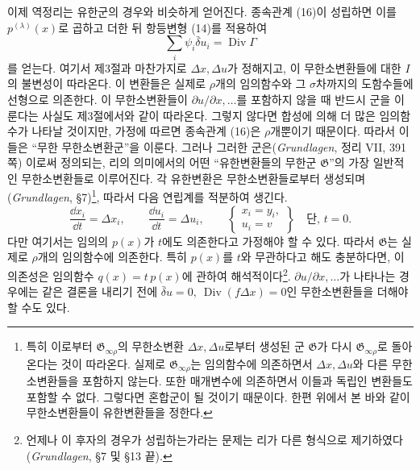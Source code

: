 이제 역정리는 유한군의 경우와 비슷하게 얻어진다. 종속관계 (16)이 성립하면 이를 \(p^{(\lambda)}(x)\)로 곱하고 더한 뒤 항등변형 (14)를 적용하여
\[
\sum_i\psi_i\bar\delta u_i=\operatorname{Div}\Gamma
\]
를 얻는다. 여기서 제3절과 마찬가지로 \(\Delta x,\Delta u\)가 정해지고, 이 무한소변환들에 대한 \(I\)의 불변성이 따라온다. 이 변환들은 실제로 \(\rho\)개의 임의함수와 그 \(\sigma\)차까지의 도함수들에 선형으로 의존한다. 이 무한소변환들이 \(\partial u/\partial x,\ldots\)를 포함하지 않을 때 반드시 군을 이룬다는 사실도 제3절에서와 같이 따라온다. 그렇지 않다면 합성에 의해 더 많은 임의함수가 나타날 것이지만, 가정에 따르면 종속관계 (16)은 \(\rho\)개뿐이기 때문이다. 따라서 이들은 ``무한 무한소변환군''을 이룬다. 그러나 그러한 군은(\emph{Grundlagen}, 정리 VII, 391쪽) 이로써 정의되는, 리의 의미에서의 어떤 ``유한변환들의 무한군 \(\mathfrak G\)''의 가장 일반적인 무한소변환들로 이루어진다. 각 유한변환은 무한소변환들로부터 생성되며(\emph{Grundlagen}, \S{}7)\footnote{특히 이로부터 \(\mathfrak G_{\infty\rho}\)의 무한소변환 \(\Delta x,\Delta u\)로부터 생성된 군 \(\mathfrak G\)가 다시 \(\mathfrak G_{\infty\rho}\)로 돌아온다는 것이 따라온다. 실제로 \(\mathfrak G_{\infty\rho}\)는 임의함수에 의존하면서 \(\Delta x,\Delta u\)와 다른 무한소변환들을 포함하지 않는다. 또한 매개변수에 의존하면서 이들과 독립인 변환들도 포함할 수 없다. 그렇다면 혼합군이 될 것이기 때문이다. 한편 위에서 본 바와 같이 무한소변환들이 유한변환들을 정한다.}, 따라서 다음 연립계를 적분하여 생긴다.
\[
\frac{\dd x_i}{\dd t}=\Delta x_i,\qquad
\frac{\dd u_i}{\dd t}=\Delta u_i,\qquad
\left\{\begin{array}{l}
x_i=y_i,\\
u_i=v
\end{array}\right\}
\quad\text{단, }t=0.
\]
다만 여기서는 임의의 \(p(x)\)가 \(t\)에도 의존한다고 가정해야 할 수 있다. 따라서 \(\mathfrak G\)는 실제로 \(\rho\)개의 임의함수에 의존한다. 특히 \(p(x)\)를 \(t\)와 무관하다고 해도 충분하다면, 이 의존성은 임의함수 \(q(x)=t\,p(x)\)에 관하여 해석적이다\footnote{언제나 이 후자의 경우가 성립하는가라는 문제는 리가 다른 형식으로 제기하였다(\emph{Grundlagen}, \S{}7 및 \S{}13 끝).}. \(\partial u/\partial x,\ldots\)가 나타나는 경우에는 같은 결론을 내리기 전에 \(\bar\delta u=0,\ \operatorname{Div}(f\Delta x)=0\)인 무한소변환들을 더해야 할 수도 있다.

